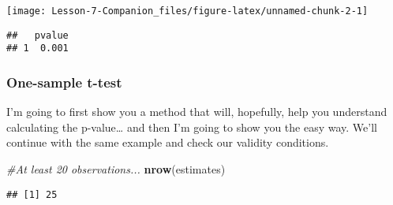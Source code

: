 \documentclass[
]{article}
\newenvironment{Shaded}{\begin{snugshade}}{\end{snugshade}}
\newcommand{\CommentTok}[1]{\textcolor[rgb]{0.56,0.35,0.01}{\textit{#1}}}
\newcommand{\DataTypeTok}[1]{\textcolor[rgb]{0.13,0.29,0.53}{#1}}
\newcommand{\KeywordTok}[1]{\textcolor[rgb]{0.13,0.29,0.53}{\textbf{#1}}}
\newcommand{\NormalTok}[1]{#1}
\newcommand{\OperatorTok}[1]{\textcolor[rgb]{0.81,0.36,0.00}{\textbf{#1}}}
\newcommand{\StringTok}[1]{\textcolor[rgb]{0.31,0.60,0.02}{#1}}
\begin{document}
\begin{center}\texttt{[image: Lesson-7-Companion\_files/figure-latex/unnamed-chunk-2-1]} \end{center}

\begin{Shaded}
\end{Shaded}

\begin{verbatim}
##   pvalue
## 1  0.001
\end{verbatim}

\hypertarget{one-sample-t-test}{%
\subsubsection{One-sample t-test}\label{one-sample-t-test}}

I'm going to first show you a method that will, hopefully, help you
understand calculating the p-value\ldots{} and then I'm going to show
you the easy way. We'll continue with the same example and check our
validity conditions.

\begin{Shaded}
\begin{Highlighting}[]
\CommentTok{#At least 20 observations...}
\KeywordTok{nrow}\NormalTok{(estimates)}
\end{Highlighting}
\end{Shaded}

\begin{verbatim}
## [1] 25
\end{verbatim}

\begin{Shaded}
\end{Shaded}
\end{document}
